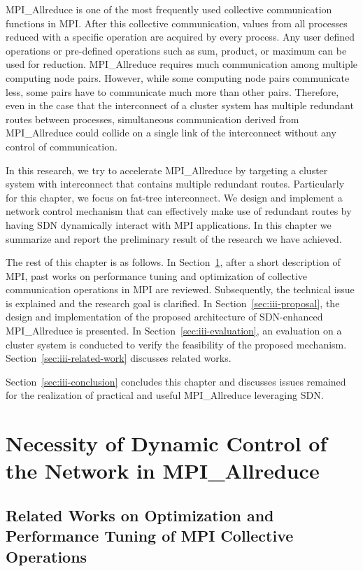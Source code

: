 MPI\_Allreduce is one of the most frequently used collective communication
functions in MPI\@. After this collective communication, values from all
processes reduced with a specific operation are acquired by every process. Any
user defined operations or pre-defined operations such as sum, product, or
maximum can be used for reduction. MPI\_Allreduce requires much communication
among multiple computing node pairs. However, while some computing node pairs
communicate less, some pairs have to communicate much more than other pairs.
Therefore, even in the case that the interconnect of a cluster system has
multiple redundant routes between processes, simultaneous communication
derived from MPI\_Allreduce could collide on a single link of the interconnect
without any control of communication.

In this research, we try to accelerate MPI\_Allreduce by targeting a cluster
system with interconnect that contains multiple redundant routes. Particularly
for this chapter, we focus on fat-tree interconnect. We design and implement a
network control mechanism that can effectively make use of redundant routes by
having SDN dynamically interact with MPI applications. In this chapter we
summarize and report the preliminary result of the research we have achieved.

The rest of this chapter is as follows. In
Section~\ref{sec:iii-background},
after a short description of MPI, past works on performance tuning and
optimization of collective communication operations in MPI are reviewed.
Subsequently, the technical issue is explained and the research goal is
clarified. In Section~\ref{sec:iii-proposal}, the design and
implementation of the proposed architecture of SDN-enhanced MPI\_Allreduce is
presented. In Section~\ref{sec:iii-evaluation}, an evaluation on a cluster system is
conducted to verify the feasibility of the proposed mechanism.
Section~\ref{sec:iii-related-work} discusses related works.

Section~\ref{sec:iii-conclusion} concludes this chapter and discusses issues
remained for the realization of practical and useful MPI\_Allreduce leveraging
SDN\@.

\section{Necessity of Dynamic Control of the Network in
MPI\_Allreduce}\label{sec:iii-background}

\subsection{Related Works on Optimization and Performance Tuning of MPI
Collective Operations}

